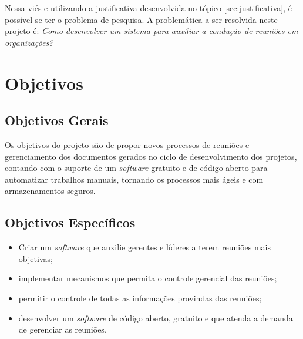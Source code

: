 Nessa viés e utilizando a justificativa desenvolvida no tópico \ref{sec:justificativa}, é possível se ter o problema de pesquisa. A problemática a ser resolvida neste projeto é: \textit{Como desenvolver um sistema para auxiliar a condução de reuniões em organizações?}

\section{Objetivos}
\label{sec:objetivos}

\subsection{Objetivos Gerais}
\label{sec:objetivos_gerais}

Os objetivos do projeto são de propor novos processos de reuniões e gerenciamento dos documentos gerados no ciclo de desenvolvimento dos projetos, contando com o suporte de um \textit{software} gratuito e de código aberto para automatizar trabalhos manuais, tornando os processos mais ágeis e com armazenamentos seguros.

\subsection{Objetivos Específicos}
\label{sec:objetivos_especificos}

\begin{itemize}
    \item Criar um \textit{software} que auxilie gerentes e líderes a terem reuniões mais objetivas;
    \item implementar mecanismos que permita o controle gerencial das reuniões;
    \item permitir o controle de todas as informações provindas das reuniões;
    \item desenvolver um \textit{software} de código aberto, gratuito e que atenda a demanda de gerenciar as reuniões.
\end{itemize}